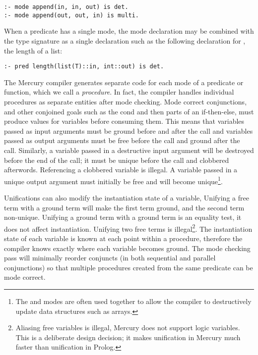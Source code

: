 \begin{verbatim}
:- mode append(in, in, out) is det.
:- mode append(out, out, in) is multi.
\end{verbatim}

\noindent
When a predicate has a single mode,
the mode declaration may be combined with the type signature as a single
declaration such as the following declaration for ,
the length of a list:

\begin{verbatim}
:- pred length(list(T)::in, int::out) is det.
\end{verbatim}

\noindent
The Mercury compiler generates separate code
for each mode of a predicate or function,
which we call a \emph{procedure}.
In fact, the compiler handles individual procedures as separate entities
after mode checking.
Mode correct conjunctions,
and other conjoined goals such as the cond and then parts of an if-then-else,
must produce values for variables before consuming them.
This means that
variables passed as input arguments must be ground before and after the
call and
variables passed as output arguments must be free before the call and
ground after the call.
Similarly, a variable passed in a destructive input argument will be destroyed
before the end of the call;
it must be unique before the call and clobbered afterwords.
Referencing a clobbered variable is illegal.
A variable passed in a unique output argument must initially be free and
will become unique\footnote{
    The \di and \uo modes are often used together to allow the compiler to
    destructively update data structures such as arrays.}.

Unifications can also modify the instantiation state of a variable,
Unifying a free term with a ground term will make the first term ground,
and the second term non-unique.
Unifying a ground term with a ground term is an equality test,
it does not affect instantiation.
Unifying two free terms is illegal\footnote{
Aliasing free variables is illegal,
Mercury does not support logic variables.
This is a deliberate design decision;
it makes unification in Mercury much
faster than unification in Prolog.}.
The instantiation state of each variable is known at each point
within a procedure,
therefore
the compiler knows exactly where each variable becomes ground.
The mode checking pass will minimally reorder conjuncts 
(in both sequential and parallel conjunctions)
so that multiple procedures created from the same predicate can be mode
correct.


